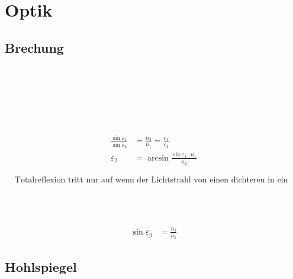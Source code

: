 \section{Optik}

\subsection{Brechung}

\begin{boxleft}
\\
\\
\\
\\
\\
\end{boxleft}\begin{boxrightshaded}
\begin{align*}
\frac{\sin{\varepsilon_1}}{\sin{\varepsilon_2}}&=\frac{n_2}{n_1}=\frac{c_1}{c_2}\\
\varepsilon_2&=\arcsin{\frac{\sin{\varepsilon_1}\cdot n_1}{n_2}}
\end{align*}
\end{boxrightshaded}

\begin{boxshaded}
\begin{align*}
&\text{Totalreflexion tritt nur auf wenn der Lichtstrahl von einen dichteren in ein wenniger dichten Stoff übergeht}
\end{align*}
\end{boxshaded}

\begin{boxleft}
\\
\\
\end{boxleft}\begin{boxrightshaded}
\begin{align*}
\sin{\varepsilon_g}&=\frac{n_2}{n_1}
\end{align*}
\end{boxrightshaded}


\subsection{Hohlspiegel}

